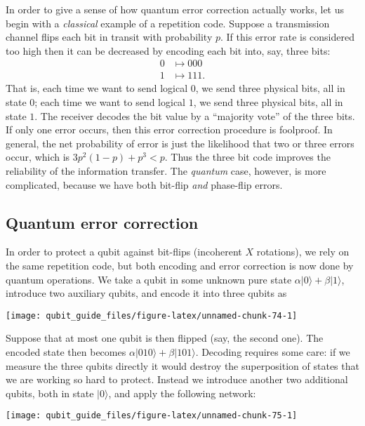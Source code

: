 \documentclass[fleqn]{article}
\begin{document}
In order to give a sense of how quantum error correction actually works, let us begin with a \emph{classical} example of a repetition code.
Suppose a transmission channel flips each bit in transit with probability \(p\).
If this error rate is considered too high then it can be decreased by encoding each bit into, say, three bits:
\[
  \begin{aligned}
    0 &\mapsto 000
  \\1 &\mapsto 111.
  \end{aligned}
\]
That is, each time we want to send logical \(0\), we send three physical bits, all in state \(0\); each time we want to send logical \(1\), we send three physical bits, all in state \(1\).
The receiver decodes the bit value by a ``majority vote'' of the three bits.
If only one error occurs, then this error correction procedure is foolproof.
In general, the net probability of error is just the likelihood that two or three errors occur, which is \(3p^2(1-p) + p^3 < p\).
Thus the three bit code improves the reliability of the information transfer.
The \emph{quantum} case, however, is more complicated, because we have both bit-flip \emph{and} phase-flip errors.

\hypertarget{quantum-error-correction}{%
\subsection{Quantum error correction}\label{quantum-error-correction}}

In order to protect a qubit against bit-flips (incoherent \(X\) rotations), we rely on the same repetition code, but both encoding and error correction is now done by quantum operations.
We take a qubit in some unknown pure state \(\alpha|0\rangle + \beta|1\rangle\), introduce two auxiliary qubits, and encode it into three qubits as

\begin{center}\texttt{[image: qubit\_guide\_files/figure-latex/unnamed-chunk-74-1]} \end{center}

Suppose that at most one qubit is then flipped (say, the second one).
The encoded state then becomes \(\alpha|010\rangle + \beta|101\rangle\).
Decoding requires some care: if we measure the three qubits directly it would destroy the superposition of states that we are working so hard to protect.
Instead we introduce another two additional qubits, both in state \(|0\rangle\), and apply the following network:

\begin{center}\texttt{[image: qubit\_guide\_files/figure-latex/unnamed-chunk-75-1]} \end{center}
\end{document}
